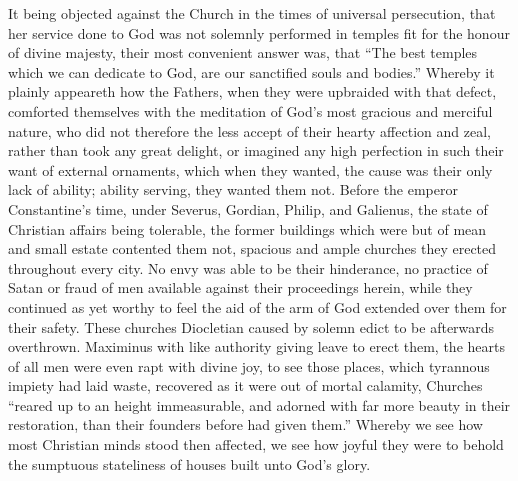 It being objected against the Church in the times of universal persecution, that her service done to God was not solemnly performed in temples fit for the honour of divine majesty, their most convenient answer was, that “The best temples which we can dedicate to God, are our sanctified souls and bodies.” Whereby it plainly appeareth how the Fathers, when they were upbraided with that defect, comforted themselves with the meditation of God’s most gracious and merciful nature, who did not therefore the less accept of their hearty affection and zeal, rather than took any great delight, or imagined any high perfection in such their want of external ornaments, which when they wanted, the cause was their only lack of ability; ability serving, they wanted them not. Before the emperor Constantine’s time, under Severus, Gordian, Philip, and Galienus, the state of Christian affairs being tolerable, the former buildings which were but of mean and small estate contented them not, spacious and ample churches they erected throughout every city. No envy was able to be their hinderance, no practice of Satan or fraud of men available against their proceedings herein, while they continued as yet worthy to feel the aid of the arm of God extended over them for their safety. These churches Diocletian caused by  solemn edict to be afterwards overthrown.
 Maximinus with like authority giving leave to erect them, the hearts of all men were even rapt with divine joy, to see those places, which tyrannous impiety had laid waste, recovered as it were out of mortal calamity, Churches “reared up to an height immeasurable, and adorned with far more beauty in their restoration, than their founders before had given them.” Whereby we see how most Christian minds stood then affected, we see how joyful they were to behold the sumptuous stateliness of houses built unto God’s glory.

